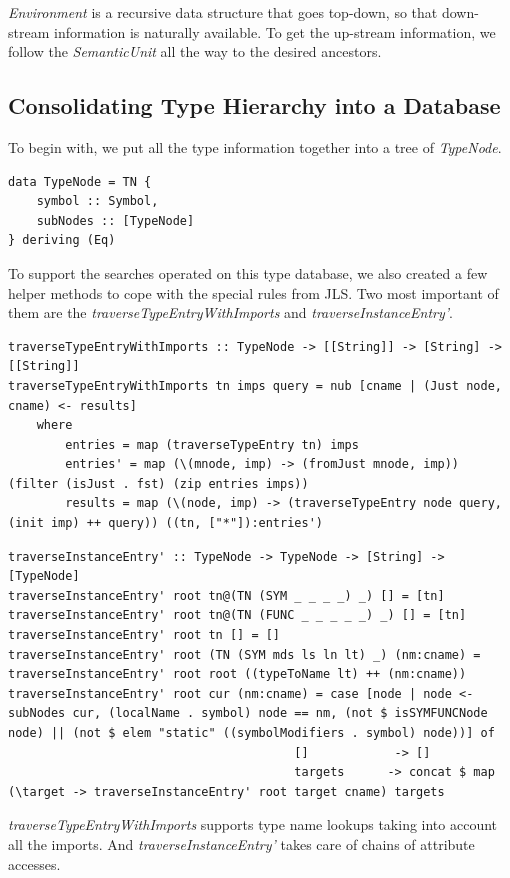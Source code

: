 \documentclass[12pt,letterpaper]{article}
\begin{document}
\emph{Environment} is a recursive data structure that goes top-down, so that down-stream information is naturally available. To get the up-stream information, we follow the \emph{SemanticUnit} all the way to the desired ancestors.

\subsection{Consolidating Type Hierarchy into a Database}
To begin with, we put all the type information together into a tree of \emph{TypeNode}.
\begin{lstlisting}
data TypeNode = TN {
    symbol :: Symbol,
    subNodes :: [TypeNode]
} deriving (Eq)
\end{lstlisting}

To support the searches operated on this type database, we also created a few helper methods to cope with the special rules from JLS. Two most important of them are the \emph{traverseTypeEntryWithImports} and \emph{traverseInstanceEntry'}.
\begin{lstlisting}
traverseTypeEntryWithImports :: TypeNode -> [[String]] -> [String] -> [[String]]
traverseTypeEntryWithImports tn imps query = nub [cname | (Just node, cname) <- results]
    where
        entries = map (traverseTypeEntry tn) imps
        entries' = map (\(mnode, imp) -> (fromJust mnode, imp)) (filter (isJust . fst) (zip entries imps))
        results = map (\(node, imp) -> (traverseTypeEntry node query, (init imp) ++ query)) ((tn, ["*"]):entries')
\end{lstlisting}

\begin{lstlisting}
traverseInstanceEntry' :: TypeNode -> TypeNode -> [String] -> [TypeNode]
traverseInstanceEntry' root tn@(TN (SYM _ _ _ _) _) [] = [tn]
traverseInstanceEntry' root tn@(TN (FUNC _ _ _ _ _) _) [] = [tn]
traverseInstanceEntry' root tn [] = []
traverseInstanceEntry' root (TN (SYM mds ls ln lt) _) (nm:cname) = traverseInstanceEntry' root root ((typeToName lt) ++ (nm:cname))
traverseInstanceEntry' root cur (nm:cname) = case [node | node <- subNodes cur, (localName . symbol) node == nm, (not $ isSYMFUNCNode node) || (not $ elem "static" ((symbolModifiers . symbol) node))] of
                                        []            -> []
                                        targets      -> concat $ map (\target -> traverseInstanceEntry' root target cname) targets
\end{lstlisting}

\emph{traverseTypeEntryWithImports} supports type name lookups taking into account all the imports. And \emph{traverseInstanceEntry'} takes care of chains of attribute accesses.
\end{document}
